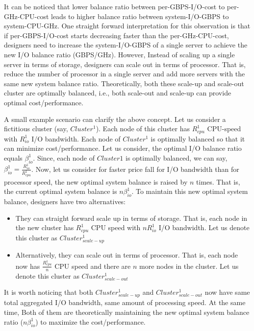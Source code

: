 \documentclass[journal]{IEEEtran}
\begin{document}
It can be noticed that lower balance ratio between per-GBPS-I/O-cost to per-GHz-CPU-cost  leads to higher balance ratio between system-I/O-GBPS  to system-CPU-GHz.
One straight forward interpretation for this observation is that if per-GBPS-I/O-cost starts decreasing faster than the per-GHz-CPU-cost, designers need to increase the system-I/O-GBPS of a single server to achieve the new I/O balance ratio (GBPS/GHz). However, Instead of scaling up a single server in terms of storage, designers can scale out in terms of processor. That is, reduce the number of processor in a single server and add more servers with the same new system balance ratio. Theoretically, both these scale-up and scale-out cluster are optimally balanced, i.e., both scale-out and scale-up can provide optimal cost/performance.

A small example scenario can clarify the above concept. Let us consider a fictitious cluster (say, $Cluster^{1}$). Each node of this cluster has $R_{cpu}^{1}$ CPU-speed with $R_{io}^{1}$ I/O bandwidth. Each node of $Cluster^{1}$ is optimally balanced so that it can minimize cost/performance. Let us consider, the optimal I/O balance ratio equals $\beta_{io}^{1}$. Since, each node of $Cluster1$ is optimally balanced, we can say, $\beta_{io}^{1}=\frac{R_{io}^{1}}{R_{cpu}^{1}}$. Now, let us consider for faster price fall for I/O bandwidth than for processor speed, the new optimal system balance is raised by $n$ times. That is, the current optimal system balance is $n\beta_{io}^{1}$. To maintain this new optimal system balance, designers have two alternatives:
\begin{itemize}
\item They can straight forward scale up in terms of storage. That is, each node in the new cluster has $R_{cpu}^{1}$ CPU speed  with $nR_{io}^{1}$ I/O bandwidth. Let us denote this cluster as $Cluster^{1}_{scale-up}$
\item Alternatively, they can scale out in terms of processor. That is, each node now has $\frac{R_{cpu}^{1}}{n}$ CPU speed and there are $n$ more nodes in the cluster. Let us denote this cluster as $Cluster^{1}_{scale-out}$
\end{itemize}
It is worth noticing that both $Cluster^{1}_{scale-up}$ and  $Cluster^{1}_{scale-out}$ now have same total aggregated I/O bandwidth, same amount of processing speed. At the same time, Both of them are theoretically maintaining the new optimal system balance ratio ($n\beta_{io}^{1}$) to maximize the cost/performance. 
\end{document}

